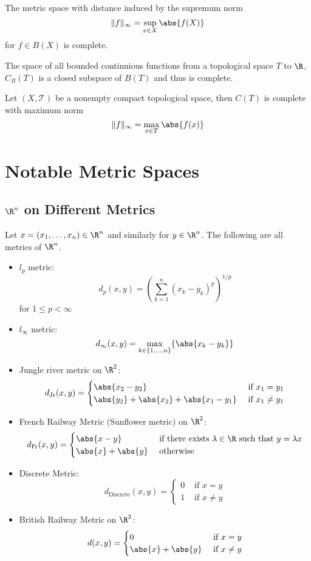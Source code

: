 \begin{prp}{}{} The metric space with distance induced by the supremum norm $$\|f\|_{\infty}=\sup_{x\in X}\abs{f(X)}$$ for $f\in B(X)$ is complete. 
\end{prp}

\begin{prp}{}{} The space of all bounded continuious functions from a topological space $T$ to $\R$, $C_B(T)$ is a closed subspace of $B(T)$ and thus is complete. 
\end{prp}

\begin{crl}{}{} Let $(X,\mathcal{T})$ be a nonempty compact topological space, then $C(T)$ is complete with maximum norm $$\|f\|_\infty=\max_{x\in T}\abs{f(x)}$$
\end{crl}


\pagebreak
\section{Notable Metric Spaces}
\subsection{$\R^n$ on Different Metrics}
\begin{thm}{}{} Let $x=(x_1,\dots,x_n)\in\R^n$ and similarly for $y\in\R^n$. The following are all metrics of $\R^n$. 
\begin{itemize}
\item $l_p$ metric: $$d_p(x,y)=\left(\sum_{k=1}^n(x_k-y_k)^p\right)^{1/p}$$ for $1\leq p<\infty$
\item $l_\infty$ metric: $$d_{\infty}(x,y)=\max_{k\in\{1,\dots,n\}}\{\abs{x_k-y_k}\}$$
\item Jungle river metric on $\R^2$: $$d_{\text{Jr}}(x,y)=\begin{cases}
\abs{x_2-y_2} & \text{ if }x_1=y_1\\
\abs{y_2}+\abs{x_2}+\abs{x_1-y_1} & \text{ if }x_1\neq y_1
\end{cases}$$
\item French Railway Metric (Sunflower metric) on $\R^2$: $$d_{\text{Fr}}(x,y)=\begin{cases}
\abs{x-y} & \text{ if there exists $\lambda\in\R$ such that } y=\lambda x\\
\abs{x}+\abs{y} & \text{ otherwise }
\end{cases}$$
\item Discrete Metric: $$d_{\text{Discrete}}(x,y)=\begin{cases}
0 & \text{ if } x=y\\
1 & \text{ if } x\neq y
\end{cases}$$
\item British Railway Metric on $\R^2$: $$d(x,y)=\begin{cases}
0 & \text{ if } x=y\\
\abs{x}+\abs{y} & \text{ if } x\neq y
\end{cases}$$
\end{itemize}
\end{thm}

